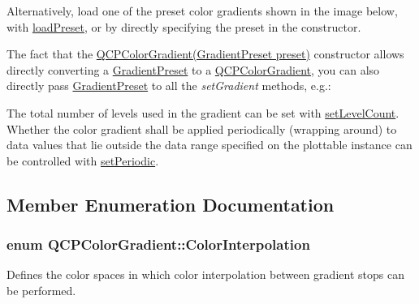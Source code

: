 \-Alternatively, load one of the preset color gradients shown in the image below, with \hyperlink{classQCPColorGradient_aa0aeec1528241728b9671bf8e60b1622}{load\-Preset}, or by directly specifying the preset in the constructor.



\-The fact that the \hyperlink{classQCPColorGradient_a546e44df5fa1846400a582c041361c85}{\-Q\-C\-P\-Color\-Gradient(\-Gradient\-Preset preset)} constructor allows directly converting a \hyperlink{classQCPColorGradient_aed6569828fee337023670272910c9072}{\-Gradient\-Preset} to a \hyperlink{classQCPColorGradient}{\-Q\-C\-P\-Color\-Gradient}, you can also directly pass \hyperlink{classQCPColorGradient_aed6569828fee337023670272910c9072}{\-Gradient\-Preset} to all the {\itshape set\-Gradient\/} methods, e.\-g.\-: 
\begin{DoxyCodeInclude}
\end{DoxyCodeInclude}
 \-The total number of levels used in the gradient can be set with \hyperlink{classQCPColorGradient_a18da587eb4f7fc788ea28ba15b6a12de}{set\-Level\-Count}. \-Whether the color gradient shall be applied periodically (wrapping around) to data values that lie outside the data range specified on the plottable instance can be controlled with \hyperlink{classQCPColorGradient_a39d6448155fc00a219f239220d14bb39}{set\-Periodic}. 

\subsection{\-Member \-Enumeration \-Documentation}
\hypertarget{classQCPColorGradient_ac5dca17cc24336e6ca176610e7f77fc1}{
\subsubsection[{\-Color\-Interpolation}]{\setlength{\rightskip}{0pt plus 5cm}enum {\bf \-Q\-C\-P\-Color\-Gradient\-::\-Color\-Interpolation}}}\label{classQCPColorGradient_ac5dca17cc24336e6ca176610e7f77fc1}
\-Defines the color spaces in which color interpolation between gradient stops can be performed.

